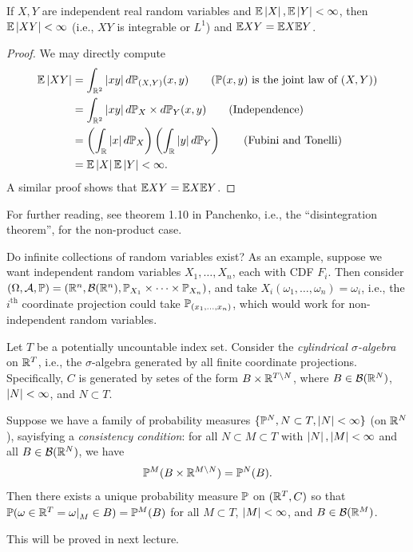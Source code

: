 \newpage
\begin{fact}
    If $X, Y$ are independent real random variables and $\mathbb E \left\lvert X \right\rvert, \mathbb E \left\lvert Y \right\rvert < \infty$, then $\mathbb E \left\lvert XY \right\rvert < \infty$ (i.e., $XY$ is integrable or $L^1$) and $\mathbb E XY = \mathbb E X \mathbb E Y$.
\end{fact}
\begin{proof}
    We may directly compute
    \begin{align*}
        \EE \abs{XY} &= \int_{\RR^2} \abs{xy} d\PP_{(X, Y)}(x, y) \tag{$\PP(x, y)$ is the joint law of $(X, Y)$} \\
        &= \int_{\RR^2} \abs{xy} d\PP_X \times d\PP_Y(x, y) \tag{Independence} \\
        &= \left(\int_\RR \abs{x} d\PP_X\right) \left(\int_\RR \abs{y} d\PP_Y\right) \tag{Fubini and Tonelli} \\
        &= \EE\abs{X} \EE\abs{Y} < \infty.
    \end{align*}
    A similar proof shows that $\mathbb E XY = \mathbb E X \mathbb E Y$.
\end{proof}

For further reading, see theorem 1.10 in Panchenko, i.e., the ``disintegration theorem'', for the non-product case.

Do infinite collections of random variables exist? As an example, suppose we want independent random variables $X_1, \dots, X_n$, each with CDF $F_i$. Then consider $(\Omega, \mathcal A, \mathbb P) = (\mathbb R^n, \mathcal B(\mathbb R^n), \mathbb P_{X_1} \times \dots \times \mathbb P_{X_n})$, and take $X_i(\omega_1, \dots, \omega_n) = \omega_i$, i.e., the $i^\text{th}$ coordinate projection could take $\mathbb P_{(x_1, \dots, x_n)}$, which would work for non-independent random variables.

\begin{theorem}
    Let $T$ be a potentially uncountable index set. Consider the \textit{cylindrical $\sigma$-algebra} on $\mathbb R^T$, i.e., the $\sigma$-algebra generated by all finite coordinate projections. Specifically, $C$ is generated by setes of the form $B \times \mathbb R^{T \setminus N}$, where $B \in \mathcal B(\mathbb R^N)$, $\left\lvert N \right\rvert < \infty$, and $N \subset T$.

    Suppose we have a family of probability measures $\{\mathbb P^N, N \subset T, \left\lvert N \right\rvert < \infty\}$ (on $\mathbb R^N$), sayisfying a \textit{consistency condition}: for all $N \subset M \subset T$ with $\left\lvert N \right\rvert, \left\lvert M \right\rvert < \infty$ and all $B \in \mathcal B(\mathbb R^N)$, we have
    \[ \mathbb P^M(B \times \mathbb R^{M \setminus N}) = \mathbb P^N(B). \]
    Then there exists a unique probability measure $\mathbb P$ on $(\mathbb R^T, C)$ so that $\PP(\omega \in \RR^T = \restr{\omega}{M} \in B) = \PP^M(B)$ for all $M \subset T$, $\left\lvert M \right\rvert < \infty$, and $B \in \mathcal B(\mathbb R^M)$.
\end{theorem}

This will be proved in next lecture.